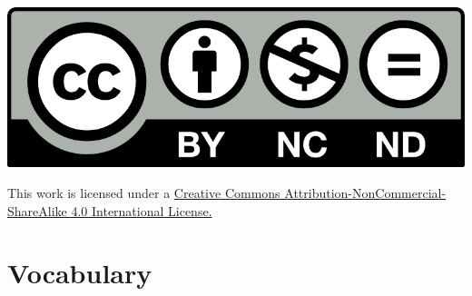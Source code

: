\documentclass[12pt]{article}
\begin{document}
\begin{center}
\includegraphics[scale=1.0]{by-nc-nd.png}

This work is licensed under a {\color{webblue}\href{https://creativecommons.org/licenses/by-nc-sa/4.0/}{Creative Commons Attribution-NonCommercial-ShareAlike 4.0 International License.}} 
\end{center}


\newpage
\section{Vocabulary}
\end{document}
